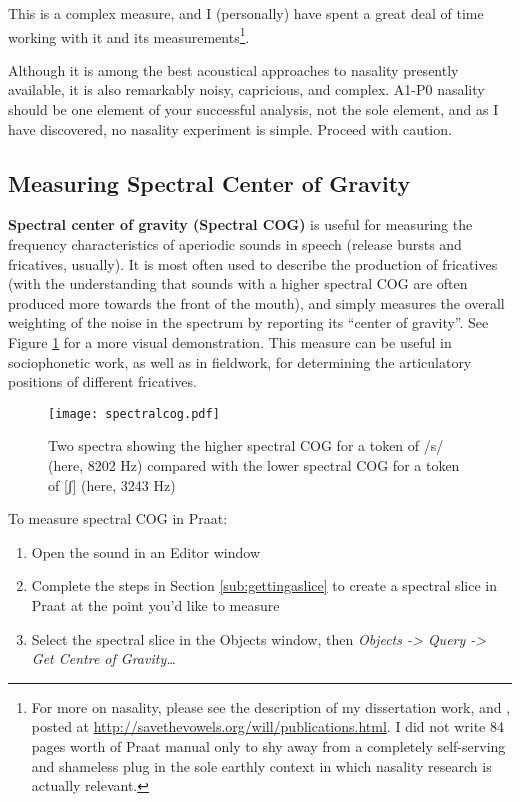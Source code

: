 \documentclass[11pt]{article}
\def\tightlist{}
\begin{document}
This is a complex measure, and I (personally) have spent a great deal of
time working with it and its
measurements\footnote{For more on nasality, please see the description of my dissertation work, \cite{Styler:2015aa} and \cite{Styler:2017}, posted at \url{http://savethevowels.org/will/publications.html}. I did not write 84 pages worth of Praat manual only to shy away from a completely self-serving and shameless plug in the sole earthly context in which nasality research is actually relevant.}.

Although it is among the best acoustical approaches to nasality
presently available, it is also remarkably noisy, capricious, and
complex. A1-P0 nasality should be one element of your successful
analysis, not the sole element, and as I have discovered, no nasality
experiment is simple. Proceed with caution.

\hypertarget{measuring-spectral-center-of-gravity}{%
\subsection{Measuring Spectral Center of
Gravity}\label{measuring-spectral-center-of-gravity}}

\textbf{Spectral center of gravity (Spectral COG)} is useful for
measuring the frequency characteristics of aperiodic sounds in speech
(release bursts and fricatives, usually). It is most often used to
describe the production of fricatives (with the understanding that
sounds with a higher spectral COG are often produced more towards the
front of the mouth), and simply measures the overall weighting of the
noise in the spectrum by reporting its ``center of gravity''. See Figure
\ref{spectralcog} for a more visual demonstration. This measure can be
useful in sociophonetic work, as well as in fieldwork, for determining
the articulatory positions of different fricatives.\\

\begin{figure}
  \centerline{
    \mbox{\texttt{[image: spectralcog.pdf]}}
  }
  \caption{Two spectra showing the higher spectral COG for a token of /s/ (here, 8202 Hz) compared with the lower spectral COG for a token of [ʃ] (here, 3243 Hz)\label{spectralcog}}

  \end{figure}

To measure spectral COG in Praat:

\begin{enumerate}
\def\labelenumi{\arabic{enumi}.}
\tightlist
\item
  Open the sound in an Editor window
\item
  Complete the steps in Section \ref{sub:gettingaslice} to create a
  spectral slice in Praat at the point you'd like to measure
\item
  Select the spectral slice in the Objects window, then \emph{Objects
  -\textgreater{} Query -\textgreater{} Get Centre of Gravity\ldots{}}
\end{enumerate}
\end{document}
